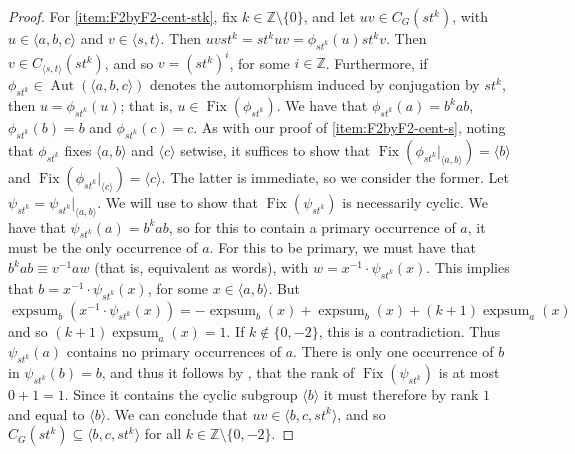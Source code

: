 \documentclass[11pt]{amsart}
\theoremstyle{definition}
\numberwithin{theorem}{section}
\DeclareMathOperator{\Fix}{Fix}
\DeclareMathOperator{\expsum}{expsum}
\DeclareMathOperator{\Aut}{Aut}
\newcommand{\Z}{\mathbb{Z}}
\begin{document}
\begin{proof}
		For \eqref{item:F2byF2-cent-stk}, fix \(k \in \Z \setminus \{0\}\), and
		let \(uv \in C_G(st^k)\), with \(u \in \langle a, b, c \rangle\) and \(v
		\in \langle s, t \rangle\).  Then \(uvst^k = st^k uv = \phi_{st^k}(u)
		st^k v\). Then \(v \in C_{\langle s, t \rangle}(st^k)\), and so \(v =
		(st^k)^i\), for some \(i \in \Z\). Furthermore, if \(\phi_{st^k} \in
		\Aut(\langle a, b ,c \rangle)\) denotes the automorphism induced by
		conjugation by \(st^k\), then \(u = \phi_{st^k}(u)\); that is, \(u \in
		\Fix(\phi_{st^k})\).  We have that \(\phi_{st^k}(a) = b^k ab\), 
		\(\phi_{st^k}(b) = b\) and \(\phi_{st^k}(c) = c\). As with
		our proof of \eqref{item:F2byF2-cent-s}, noting that
		\(\phi_{st^k}\) fixes \(\langle a, b \rangle\) and \(\langle c \rangle\)
		setwise, it suffices to show that \(\Fix(\phi_{st^k}|_{\langle a, b \rangle})
		= \langle b \rangle\) and \(\Fix(\phi_{st^k}|_{\langle c \rangle}) = 
		\langle c \rangle\). The latter is immediate, so we consider
		the former.
		Let \(\psi_{st^k} = \psi_{st^k} |_{\langle a, b \rangle}\). We will use
		\cite[Theorem 2]{CohenLustig89} to show that \(\Fix(\psi_{st^k})\) is
		necessarily cyclic. We have that \(\psi_{st^k}(a) = b^k ab\), so for
		this to contain a primary occurrence of \(a\), it must be the only
		occurrence of \(a\). For this to be primary, we must have that \(b^k a
		b \equiv v^{-1} a w\) (that is, equivalent as words), with \(w =
		x^{-1}\cdot \psi_{st^k}(x)\). This implies that \(b = x^{-1} \cdot
		\psi_{st^k}(x)\), for some \(x \in \langle a, b \rangle\). But
		\(\expsum_b(x^{-1} \cdot \psi_{st^k}(x)) = - \expsum_b(x) +
		\expsum_b(x) + (k + 1)\expsum_a(x)\) and so \((k + 1)\expsum_a(x) =
		1\). If \(k \notin \{0, -2\}\), this is a contradiction. Thus
		\(\psi_{st^k}(a)\) contains no primary occurrences of \(a\). There is
		only one occurrence of \(b\) in \(\psi_{st^k}(b) = b\), and thus it
		follows by \cite[Theorem 2]{CohenLustig89}, that the rank of
		\(\Fix(\psi_{st^k})\) is at most \(0 + 1 = 1\). Since it contains the
		cyclic subgroup \(\langle b \rangle\) it must therefore by rank \(1\)
		and equal to \(\langle b \rangle\). We can conclude that \(uv \in
		\langle b, c, st^k \rangle\), and so \(C_G(st^k) \subseteq \langle b,c, st^k
		\rangle\) for all \(k \in \Z \setminus \{0, -2\}\).


\end{proof}
\end{document}
